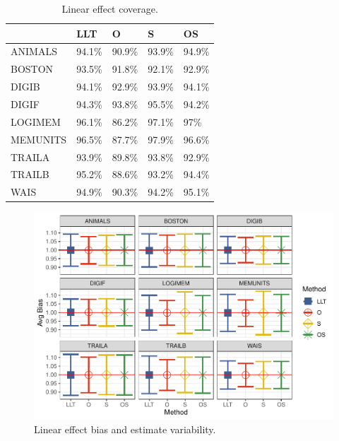 \documentclass[
]{article}
\begin{document}
\begin{table}

\caption{\label{tab:unnamed-chunk-33}Linear effect coverage.}
\centering
\begin{tabular}[t]{lllll}
\toprule
  & LLT & O & S & OS\\
\midrule
ANIMALS & 94.1\% & 90.9\% & 93.9\% & 94.9\%\\
BOSTON & 93.5\% & 91.8\% & 92.1\% & 92.9\%\\
DIGIB & 94.1\% & 92.9\% & 93.9\% & 94.1\%\\
DIGIF & 94.3\% & 93.8\% & 95.5\% & 94.2\%\\
LOGIMEM & 96.1\% & 86.2\% & 97.1\% & 97\%\\
\addlinespace
MEMUNITS & 96.5\% & 87.7\% & 97.9\% & 96.6\%\\
TRAILA & 93.9\% & 89.8\% & 93.8\% & 92.9\%\\
TRAILB & 95.2\% & 88.6\% & 93.2\% & 94.4\%\\
WAIS & 94.9\% & 90.3\% & 94.2\% & 95.1\%\\
\bottomrule
\end{tabular}
\end{table}

\begin{figure}
\centering
\includegraphics{Master_files/figure-latex/unnamed-chunk-34-1.pdf}
\caption{\label{fig:unnamed-chunk-34}Linear effect bias and estimate variability.}
\end{figure}
\end{document}
